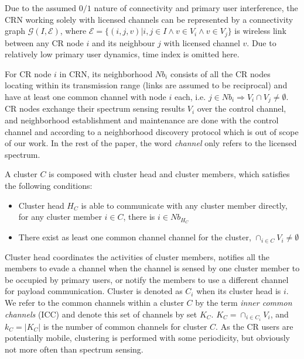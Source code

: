 Due to the assumed $0/1$ nature of connectivity and primary user interference, the CRN working solely with licensed channels can be represented by a connectivity graph $\mathcal{G}(I,\mathcal{E})$, where $\mathcal{E}=\lbrace(i,j,v) \vert i, j \in I \wedge v\in V_i \wedge v\in V_j \rbrace$ is wireless link between any CR node $i$ and its neighbour $j$ with licensed channel $v$.
Due to relatively low primary user dynamics, time index is omitted here.


For CR node $i$ in CRN, its neighborhood $Nb_i$ consists of all the CR nodes locating within its transmission range (links are assumed to be reciprocal) and have at least one common channel with node $i$ each, i.e. $ j\in Nb_i \Rightarrow V_i\cap V_j\neq \emptyset$.
CR nodes exchange their spectrum sensing results $V_{i}$ over the control channel, and neighborhood establishment and maintenance are done with the control channel and according to a neighborhood discovery protocol which is out of scope of our work.
In the rest of the paper, the word \textit{channel} only refers to the licensed spectrum.

A cluster $C$ is composed with cluster head and cluster members, which satisfies the following conditions:

\begin{itemize}
\item Cluster head $H_C$ is able to communicate with any cluster member directly, \ie for any cluster member $i\in C$, there is $i\in Nb_{H_C}$
\item There exist as least one common channel channel for the cluster, \ie $\cap_{i\in C} V_i \neq \emptyset$
\end{itemize}
Cluster head coordinates the activities of cluster members, \ie notifies all the members to evade a channel when the channel is sensed by one cluster member to be occupied by primary users, or notify the members to use a different channel for payload communication. 
Cluster is denoted as $C_i$ when its cluster head is $i$.
We refer to the common channels within a cluster $C$ by the term \textit{inner common channels} (ICC) and denote this set of channels by set $K_C$.
$ K_C = \cap_{i\in C_i} V_i$, and $k_C = |K_C|$ is the number of common channels for cluster $C$.
As the CR users are potentially mobile, clustering is performed with some periodicity, but obviously not more often than spectrum sensing.



